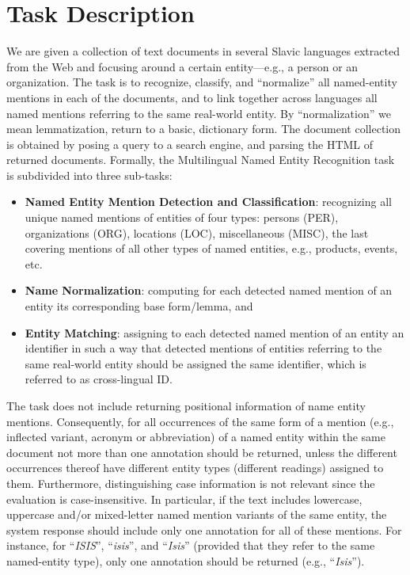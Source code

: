 \documentclass[11pt]{article}
\begin{document}
\section{Task Description}
\label{sec:task}


We are given a collection of text documents in several Slavic languages
extracted from the Web and focusing around a certain entity---e.g., a
person or an organization.  The task is to recognize, classify, and
``normalize'' all named-entity mentions in each of the documents, and to
link together across languages all named mentions referring to the same
real-world entity.  By ``normalization'' we mean lemmatization, return to
a basic, dictionary form.  The document collection is obtained by posing
a query to a search engine, and parsing the HTML of returned documents.
Formally, the Multilingual Named Entity Recognition task is
subdivided into three sub-tasks:

\begin{itemize}

\item \textbf{Named Entity Mention Detection and Classification}:
  recognizing all unique named mentions of entities of four types:
  persons (PER), organizations (ORG), locations (LOC), miscellaneous
  (MISC), the last covering mentions of all other types of named
  entities, e.g., products, events, etc.

\item \textbf{Name Normalization}: computing for each detected named mention of an entity its corresponding base form/lemma, and

\item \textbf{Entity Matching}: assigning to each detected named mention of an entity an identifier in such a way that detected 
  mentions of entities referring to the same real-world entity should be assigned the same identifier, which is referred to as 
  cross-lingual ID.

\end{itemize}

\noindent The task does not include returning positional information of name entity mentions. Consequently,
for all occurrences of the same form of a mention (e.g., inflected variant, acronym or abbreviation) of a named entity 
within the same document not more than one annotation should be returned, unless the different occurrences thereof have 
different entity types (different readings) assigned to them. Furthermore, distinguishing case information is not relevant
since the evaluation is case-insensitive. In particular, if the text includes lowercase, uppercase and/or mixed-letter 
named mention variants of the same entity, the system response should include only one annotation for all of these mentions. 
For instance, for ``\textit{ISIS}'', ``\textit{isis}'', and ``\textit{Isis}'' (provided that they refer to the same named-entity type), 
only one annotation should be returned (e.g., ``\textit{Isis}'').
\end{document}
